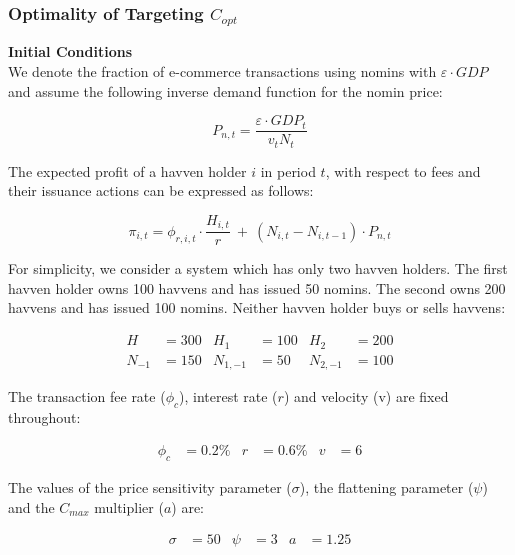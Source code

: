 \newpage
\subsubsection{Optimality of Targeting \(C_{opt}\)}
\label{subsubsec:coptimality}

\noindent \textbf{Initial Conditions} \\

\noindent We denote the fraction of e-commerce transactions using nomins with $\varepsilon \cdot GDP$ and
assume the following inverse demand function for the nomin price:

\begin{equation*}
    \label{eq:nominprice} P_{n,t} = \frac{\varepsilon \cdot GDP_t}{v_tN_t}
\end{equation*}

\vspace{4mm}

\noindent The expected profit of a havven holder \(i\) in period \(t\), with
respect to fees and their issuance actions can be expressed as follows:

\begin{equation*} 
\pi_{i,t} = \phi_{r,i,t} \cdot \frac{H_{i,t}}{r} \ + \ (N_{i,t} - N_{i,t-1}) \cdot P_{n,t} \label{eq:profit}
\end{equation*}


\noindent For simplicity, we consider a system which
has only two havven holders. The first havven holder owns 100 havvens and has
issued 50 nomins. The second owns 200 havvens and has issued 100 nomins.
Neither havven holder buys or sells havvens:

\begin{align*}
H &= 300 & H_1 &= 100 & H_2 &= 200 \\
N_{-1} &= 150 & N_{1,-1} &= 50 & N_{2,-1} &= 100
\end{align*}

\noindent The transaction fee rate (\(\phi_c\)), interest rate (\(r\)) and
velocity (v) are fixed throughout:

\begin{align*}
\phi_c &= 0.2\% & r &= 0.6\%  & v &= 6
\end{align*}

\noindent The values of the price sensitivity parameter (\(\sigma\)), the
flattening parameter (\(\psi\)) and the \(C_{max}\) multiplier (\(a\)) are:

\begin{align*}
\sigma &= 50 & \psi &= 3 & a&= 1.25
\end{align*}

